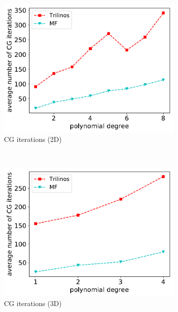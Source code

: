 \documentclass[AMA,STIX1COL]{WileyNJD-v2}
\begin{document}
\begin{figure}[!ht]
  \begin{subfigure}[b]{0.49\textwidth}
    \centering
    \includegraphics[width=\textwidth]{CSL_Munich_cg2d.pdf}
    \caption{CG iterations (2D)}
    \label{fig:benchmark_miehe_CSL_cg2}
  \end{subfigure}
  ~
  \begin{subfigure}[b]{0.49\textwidth}
    \centering
    \includegraphics[width=\textwidth]{CSL_Munich_cg3d.pdf}
    \caption{CG iterations (3D)}
    \label{fig:benchmark_miehe_CSL_cg3}
  \end{subfigure}
  ~
  \begin{subfigure}[b]{0.49\textwidth}
    \centering

\end{subfigure}
\end{figure}
\end{document}
